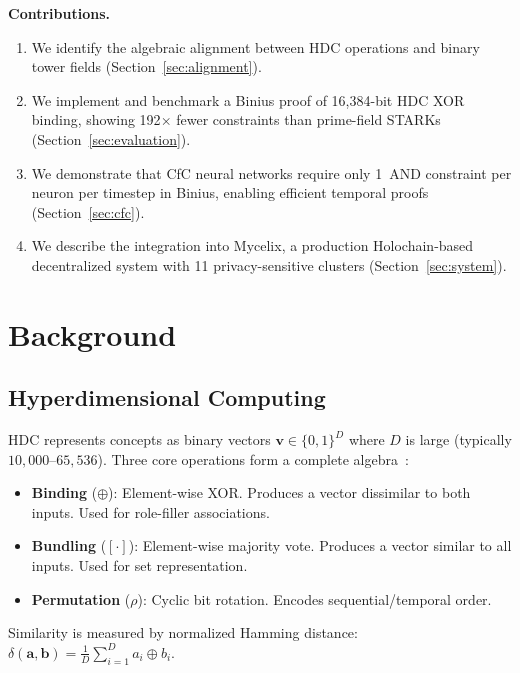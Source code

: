 \documentclass[11pt,twocolumn]{article}
\begin{document}
\textbf{Contributions.}
\begin{enumerate}
    \item We identify the algebraic alignment between HDC operations and binary tower fields (Section~\ref{sec:alignment}).
    \item We implement and benchmark a Binius proof of 16,384-bit HDC XOR binding, showing 192$\times$ fewer constraints than prime-field STARKs (Section~\ref{sec:evaluation}).
    \item We demonstrate that CfC neural networks require only 1~AND constraint per neuron per timestep in Binius, enabling efficient temporal proofs (Section~\ref{sec:cfc}).
    \item We describe the integration into Mycelix, a production Holochain-based decentralized system with 11 privacy-sensitive clusters (Section~\ref{sec:system}).
\end{enumerate}

\section{Background}

\subsection{Hyperdimensional Computing}

HDC represents concepts as binary vectors $\mathbf{v} \in \{0,1\}^D$ where $D$ is large (typically $10{,}000$--$65{,}536$). Three core operations form a complete algebra~\cite{plate1995holographic}:

\begin{itemize}
    \item \textbf{Binding} ($\oplus$): Element-wise XOR. Produces a vector dissimilar to both inputs. Used for role-filler associations.
    \item \textbf{Bundling} ($[\cdot]$): Element-wise majority vote. Produces a vector similar to all inputs. Used for set representation.
    \item \textbf{Permutation} ($\rho$): Cyclic bit rotation. Encodes sequential/temporal order.
\end{itemize}

Similarity is measured by normalized Hamming distance: $\delta(\mathbf{a}, \mathbf{b}) = \frac{1}{D}\sum_{i=1}^{D} a_i \oplus b_i$.
\end{document}
